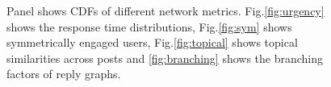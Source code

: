 \begin{figure}[!ht]
    \centering
    
    
    
    
    \caption{Panel shows CDFs of different network metrics. Fig.\ref{fig:urgency} shows the response time distributions, Fig.\ref{fig:sym} shows symmetrically engaged users, Fig.\ref{fig:topical} shows topical similarities across posts and \ref{fig:branching} shows the branching factors of reply graphs. }
\end{figure}

